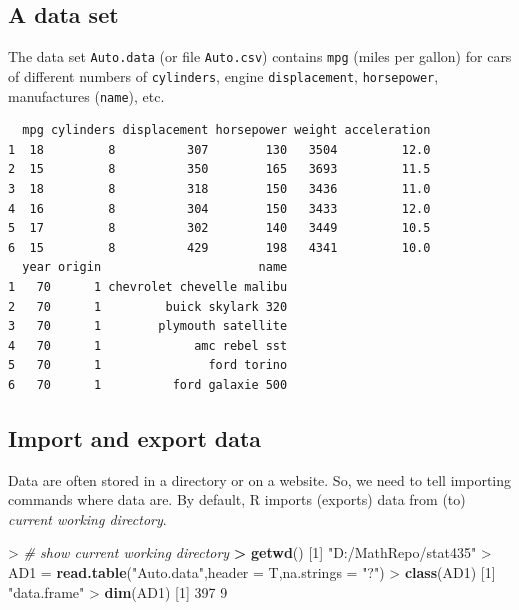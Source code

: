 \documentclass[]{article}
\newenvironment{Shaded}{\begin{snugshade}}{\end{snugshade}}
\newcommand{\KeywordTok}[1]{\textcolor[rgb]{0.13,0.29,0.53}{\textbf{{#1}}}}
\newcommand{\DataTypeTok}[1]{\textcolor[rgb]{0.13,0.29,0.53}{{#1}}}
\newcommand{\DecValTok}[1]{\textcolor[rgb]{0.00,0.00,0.81}{{#1}}}
\newcommand{\StringTok}[1]{\textcolor[rgb]{0.31,0.60,0.02}{{#1}}}
\newcommand{\CommentTok}[1]{\textcolor[rgb]{0.56,0.35,0.01}{\textit{{#1}}}}
\newcommand{\ErrorTok}[1]{\textcolor[rgb]{0.64,0.00,0.00}{\textbf{{#1}}}}
\newcommand{\NormalTok}[1]{{#1}}
\begin{document}
\subsection{A data set}\label{a-data-set}

The data set \texttt{Auto.data} (or file \texttt{Auto.csv}) contains
\texttt{mpg} (miles per gallon) for cars of different numbers of
\texttt{cylinders}, engine \texttt{displacement}, \texttt{horsepower},
manufactures (\texttt{name}), etc.

\begin{verbatim}
  mpg cylinders displacement horsepower weight acceleration
1  18         8          307        130   3504         12.0
2  15         8          350        165   3693         11.5
3  18         8          318        150   3436         11.0
4  16         8          304        150   3433         12.0
5  17         8          302        140   3449         10.5
6  15         8          429        198   4341         10.0
  year origin                      name
1   70      1 chevrolet chevelle malibu
2   70      1         buick skylark 320
3   70      1        plymouth satellite
4   70      1             amc rebel sst
5   70      1               ford torino
6   70      1          ford galaxie 500
\end{verbatim}

\subsection{Import and export data}\label{import-and-export-data-1}

Data are often stored in a directory or on a website. So, we need to
tell importing commands where data are. By default, R imports (exports)
data from (to) \emph{current working directory}.

\begin{Shaded}
\begin{Highlighting}[]
\NormalTok{>}\StringTok{ }\CommentTok{# show current working directory}
\ErrorTok{>}\StringTok{ }\KeywordTok{getwd}\NormalTok{()}
\NormalTok{[}\DecValTok{1}\NormalTok{] }\StringTok{"D:/MathRepo/stat435"}
\NormalTok{>}\StringTok{ }\NormalTok{AD1 =}\StringTok{ }\KeywordTok{read.table}\NormalTok{(}\StringTok{"Auto.data"}\NormalTok{,}\DataTypeTok{header =} \NormalTok{T,}\DataTypeTok{na.strings =} \StringTok{"?"}\NormalTok{)}
\NormalTok{>}\StringTok{ }\KeywordTok{class}\NormalTok{(AD1)}
\NormalTok{[}\DecValTok{1}\NormalTok{] }\StringTok{"data.frame"}
\NormalTok{>}\StringTok{ }\KeywordTok{dim}\NormalTok{(AD1)}
\NormalTok{[}\DecValTok{1}\NormalTok{] }\DecValTok{397}   \DecValTok{9}
\end{Highlighting}
\end{Shaded}
\end{document}
